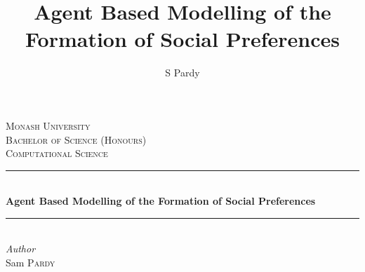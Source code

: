 \documentclass[12pt]{article}
\title{Agent Based Modelling of the Formation of Social Preferences}
\author{S Pardy}
\begin{document}
\begin{titlepage}
	\newcommand{\HRule}{\rule{\linewidth}{0.5mm}} %
	
	\center %
	
	
	\textsc{\LARGE Monash University}\\[1.5cm]	
	\textsc{\Large Bachelor of Science (Honours)}\\[0.5cm] %
	
	\textsc{\large Computational Science}\\[0.5cm] %
	
	
	\HRule\\[0.4cm]
	
	{\huge\bfseries Agent Based Modelling of the Formation of Social Preferences}\\[0.4cm]
	
	\HRule\\[1.5cm]
	
	
	
	{\large\textit{Author}}\\
	Sam \textsc{Pardy} %
	
	

\end{titlepage}
\end{document}
